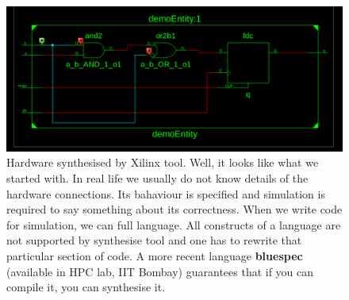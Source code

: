 \documentclass[a4paper,10pt]{article}
\begin{document}
  \begin{figure}[h] \centering
    \includegraphics[width=\textwidth]{./../GHDLDemo/Xilinx/bhav.png}
    \caption{Hardware synthesised by Xilinx tool. Well, it looks like what we
    started with. In real life we usually do not know details of the hardware
    connections. Its bahaviour is specified and simulation is required to say
    something about its correctness. When we write code for simulation, we can
    full language. All constructs of a language are not supported by synthesise
    tool and one has to rewrite that particular section of code. A more recent
    language \textbf{bluespec} (available in HPC lab, IIT Bombay) guarantees
    that if you can compile it, you can synthesise it. } \label{fig:synthesis}

  \end{figure}
\end{document}

